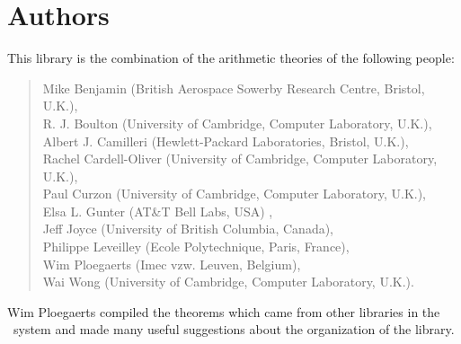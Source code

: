 \vfill
\chapter*{Authors}

This library is the combination of the arithmetic theories of the following people:

\begin{quote}
Mike Benjamin (British Aerospace Sowerby Research Centre, Bristol, U.K.), \\
R. J. Boulton (University of Cambridge, Computer Laboratory, U.K.),	 \\
Albert J. Camilleri (Hewlett-Packard Laboratories, Bristol, U.K.), \\
Rachel Cardell-Oliver (University of Cambridge, Computer Laboratory, U.K.), \\
Paul Curzon (University of Cambridge, Computer Laboratory, U.K.), \\
Elsa L. Gunter (AT\&T Bell Labs, USA) , \\
Jeff Joyce (University of British Columbia, Canada), \\
Philippe Leveilley (Ecole Polytechnique, Paris, France), \\
Wim Ploegaerts   (Imec vzw. Leuven, Belgium), \\
Wai Wong (University of Cambridge, Computer Laboratory, U.K.). \\
\end{quote}

\noindent Wim Ploegaerts compiled the theorems which came from other libraries
in the \HOL\ system and made many useful suggestions about the organization of
the library.



\newpage
